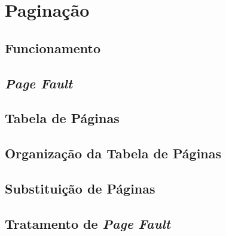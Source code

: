 \section{Paginação}
\subsection{Funcionamento}
\subsection{\textit{Page Fault}}
\subsection{Tabela de Páginas}
\subsection{Organização da Tabela de Páginas}
\subsection{Substituição de Páginas}
\subsection{Tratamento de \textit{Page Fault}}

